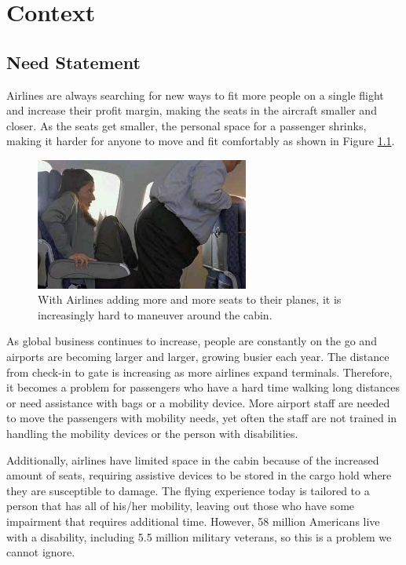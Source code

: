 \chapter{Context}
\label{sec-context} %

\section{Need Statement}
Airlines are always searching for new ways to fit more people on a single flight and increase their profit margin, making the seats in the aircraft smaller and closer. As the seats get smaller, the personal space for a passenger shrinks, making it harder for anyone to move and fit comfortably as shown in Figure \ref{fig:9}.

\begin{figure}[h]
  \centering
     \includegraphics[width=7cm]{images/image009.png}
   \caption{With Airlines adding more and more seats to their planes, it is increasingly hard to maneuver around the cabin. \cite{2014airlines}}
  \label{fig:9}
\end{figure}


As global business continues to increase, people are constantly on the go and airports are becoming larger and larger, growing busier each year.  The distance from check-in to gate is increasing as more airlines expand terminals. Therefore, it becomes a problem for passengers who have a hard time walking long distances or need assistance with bags or a mobility device. More airport staff are needed to move the passengers with mobility needs, yet often the staff are not trained in handling the mobility devices or the person with disabilities.  

Additionally, airlines have  limited space in the cabin because of the increased amount of seats, requiring assistive devices to be stored in the cargo hold where they are susceptible to damage.  The flying experience today is tailored to a person that has all of his/her mobility, leaving out those who have some impairment that requires additional time. However, 58 million Americans live with a disability, including 5.5 million military veterans, so this is a problem we cannot ignore. %

